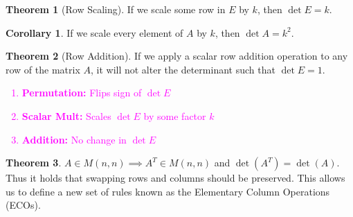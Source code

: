 \documentclass{article}
\numberwithin{equation}{section}
\theoremstyle{definition}
\newtheorem{thm}{Theorem}[subsection]
\newtheorem{cor}{Corollary}[thm]
\theoremstyle{adefn}
\begin{document}
	\begin{thm}[Row Scaling]
		If we scale some row in $E$ by $k$, then $\det E = k$. 
	\end{thm}
	\begin{cor}
		If we scale every element of $A$ by $k$, then $\det A = k^2$. 
	\end{cor}
	\begin{thm}[Row Addition]
		If we apply a scalar row addition operation to any row of the matrix $A$, it will not alter the determinant such that $\det E = 1$.
	\end{thm}
	\begin{framed}
		\textcolor{magenta}{
			\begin{enumerate}
				\itemsep0em
				\item \textbf{Permutation:} Flips sign of $\det E$
				\item \textbf{Scalar Mult:} Scales $\det E$ by some factor $k$
				\item \textbf{Addition:} No change in $\det E$
			\end{enumerate}
		}
	\end{framed}
	\begin{thm}
		$A \in M(n, n) \implies A^T \in M(n, n)$ and $\det(A^T) = \det(A)$. Thus it holds that swapping rows and columns should be preserved. This allows us to define a new set of rules known as the Elementary Column Operations (ECOs). 
	\end{thm}
	
\end{document}
